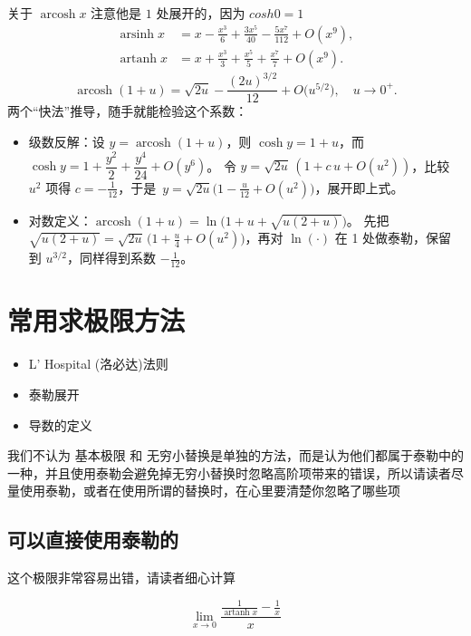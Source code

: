 \documentclass[lang=cn,newtx,10pt,scheme=chinese]{elegantbook}
\DeclareMathOperator{\arsinh}{arsinh}
\DeclareMathOperator{\arcosh}{arcosh}
\DeclareMathOperator{\artanh}{artanh}
\begin{document}
\begin{itemize}
  关于 $\arcosh x $ 注意他是 $1$ 处展开的，因为 $cosh 0=1$
  \begin{equation}
    \begin{aligned}
      \arsinh x &= x-\frac{x^{3}}{6}+\frac{3x^{5}}{40}-\frac{5x^{7}}{112}+O(x^{9}),\\
      \artanh x &= x+\frac{x^{3}}{3}+\frac{x^{5}}{5}+\frac{x^{7}}{7}+O(x^{9}).
    \end{aligned}
  \end{equation}
  \begin{equation}
    \arcosh(1+u)=\sqrt{2u}-\frac{(2u)^{3/2}}{12}+O\!\big(u^{5/2}\big),\quad u\to 0^{+}.
  \end{equation}
  两个“快法”推导，随手就能检验这个系数：
  \begin{itemize}
    \item 级数反解：设 $y=\arcosh(1+u)$，则 $\cosh y=1+u$，而 $\cosh y=1+\dfrac{y^{2}}{2}+\dfrac{y^{4}}{24}+O(y^{6})$。
    令 $y=\sqrt{2u}\,(1+c\,u+O(u^{2}))$，比较 $u^{2}$ 项得 $c=-\tfrac{1}{12}$，于是
    $\,y=\sqrt{2u}\big(1-\tfrac{u}{12}+O(u^{2})\big)$，展开即上式。
    \item 对数定义：$\arcosh(1+u)=\ln\big(1+u+\sqrt{u(2+u)}\big)$。
    先把 $\sqrt{u(2+u)}=\sqrt{2u}\,\big(1+\tfrac{u}{4}+O(u^{2})\big)$，再对 $\ln(\cdot)$ 在 1 处做泰勒，保留到 $u^{3/2}$，同样得到系数 $-\tfrac{1}{12}$。
  \end{itemize}
\end{itemize}
\section{常用求极限方法}
\begin{itemize}
  \item L' Hospital (洛必达)法则
  \item 泰勒展开
  \item 导数的定义
\end{itemize}

我们不认为 基本极限  和 无穷小替换是单独的方法，而是认为他们都属于泰勒中的一种，并且使用泰勒会避免掉无穷小替换时忽略高阶项带来的错误，所以请读者尽量使用泰勒，或者在使用所谓的替换时，在心里要清楚你忽略了哪些项
\subsection{可以直接使用泰勒的}
\begin{example}
  这个极限非常容易出错，请读者细心计算

  \begin{equation}
   \lim_{x \to 0} \frac{\frac{1}{\artanh x} -\frac{1}{x}}{x}
  \end{equation}
\end{example}
\end{document}
